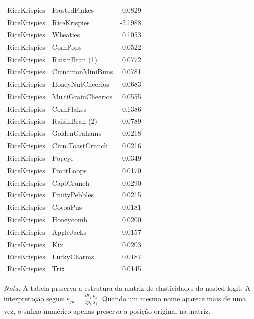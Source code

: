 \begin{table}[H]
\begin{tabular}{llr}
RiceKrispies & FrostedFlakes & 0.0829 \\
RiceKrispies & RiceKrispies & -2.1988 \\
RiceKrispies & Wheaties & 0.1053 \\
RiceKrispies & CornPops & 0.0522 \\
RiceKrispies & RaisinBran (1) & 0.0772 \\
RiceKrispies & CinnamonMiniBuns & 0.0781 \\
RiceKrispies & HoneyNutCheerios & 0.0683 \\
RiceKrispies & MultiGrainCheerios & 0.0555 \\
RiceKrispies & CornFlakes & 0.1386 \\
RiceKrispies & RaisinBran (2) & 0.0789 \\
RiceKrispies & GoldenGrahams & 0.0218 \\
RiceKrispies & Cinn.ToastCrunch & 0.0216 \\
RiceKrispies & Popeye & 0.0349 \\
RiceKrispies & FrootLoops & 0.0170 \\
RiceKrispies & CaptCrunch & 0.0290 \\
RiceKrispies & FruityPebbles & 0.0215 \\
RiceKrispies & CocoaPus & 0.0181 \\
RiceKrispies & Honeycomb & 0.0200 \\
RiceKrispies & AppleJacks & 0.0157 \\
RiceKrispies & Kix & 0.0203 \\
RiceKrispies & LuckyCharms & 0.0187 \\
RiceKrispies & Trix & 0.0145 \\
\bottomrule
\end{tabular}

\vspace{0.3em}
\footnotesize
\textit{Nota:} A tabela preserva a estrutura da matriz de elasticidades do nested logit. A interpretação segue: $\varepsilon_{jk}=\frac{\partial s_j}{\partial p_k}\frac{p_k}{s_j}$. Quando um mesmo nome aparece mais de uma vez, o sufixo numérico apenas preserva a posição original na matriz.
\end{table}
\endgroup


